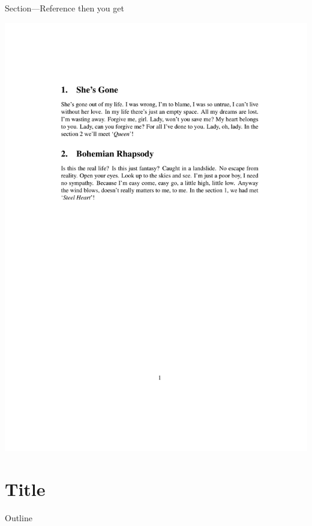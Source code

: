 \documentclass[12pt]{gshs_lecture}
\begin{document}
\begin{frame}[t]{Section---Reference}\small
then you get
\begin{center}
\begin{framed}
\includegraphics[width=\textwidth,trim={0cm 16cm 0cm 4cm},clip]{./test_article/article006.pdf}
\end{framed}
\end{center}
\end{frame}

\section{Title} %

\begin{frame}[t]{Outline}
\tableofcontents[currentsection]
\end{frame}
\end{document}
